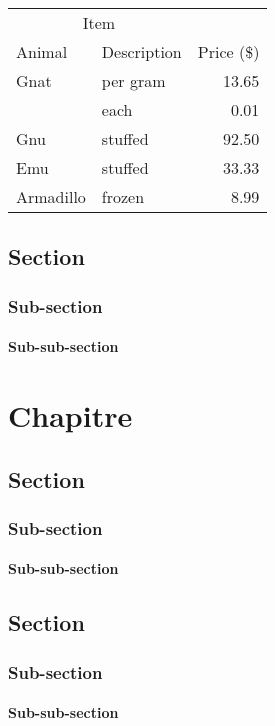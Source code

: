 \documentclass[twoside,titlepage,paper=a4,fontsize=12pt,numbers=noenddot,cleardoublepage=empty,BCOR=5mm,openright]{scrreprt}
\begin{document}
\begin{tabular}{@{}llr@{}} \toprule
\multicolumn{2}{c}{Item} \\ \cmidrule(r){1-2}
Animal & Description & Price (\$)\\ \midrule
Gnat & per gram & 13.65 \\
& each & 0.01 \\
Gnu & stuffed & 92.50 \\
Emu & stuffed & 33.33 \\
Armadillo & frozen & 8.99 \\ \bottomrule
\end{tabular}

\section{Section}
\subsection{Sub-section}
\subsubsection{Sub-sub-section}

\chapter{Chapitre}

\section{Section}
\subsection{Sub-section}
\subsubsection{Sub-sub-section}

\section{Section}
\subsection{Sub-section}
\subsubsection{Sub-sub-section}

\appendix

\cleardoublepage %
\end{document}
